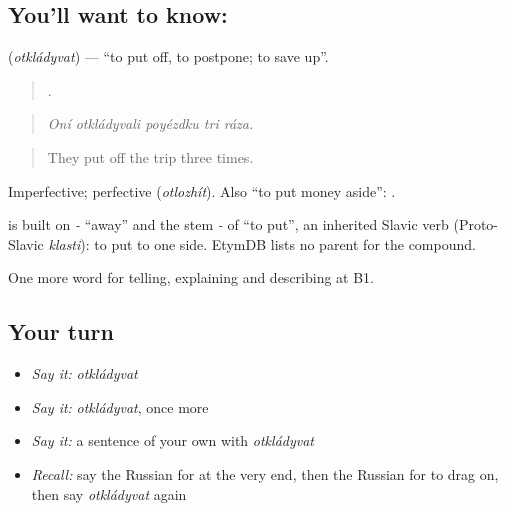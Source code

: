 \subsection*{You'll want to know: }
\textbf{} (\emph{otkládyvat}) — \textquotedblleft{}to put off, to postpone; to save up\textquotedblright{}.

\begin{quote}
    .
\end{quote}

\begin{quote}
\emph{Oní otkládyvali poyézdku tri ráza.}
\end{quote}

\begin{quote}
They put off the trip three times.
\end{quote}

Imperfective; perfective \emph{} (\emph{otlozhít}). Also \textquotedblleft{}to put money aside\textquotedblright{}: \emph{ }.

\begin{cousinweb}
\emph{} is built on \emph{-} \textquotedblleft{}away\textquotedblright{} and the stem \emph{-} of \emph{} \textquotedblleft{}to put\textquotedblright{}, an inherited Slavic verb (Proto-Slavic \emph{klasti}): to put to one side. EtymDB lists no parent for the compound.
\end{cousinweb}

\begin{grammarlens}[title={What you've built}]
One more word for telling, explaining and describing at B1.
\end{grammarlens}

\subsection*{Your turn}
\begin{itemize}
\raggedright
  \item \emph{Say it:} \emph{otkládyvat}
  \item \emph{Say it:} \emph{otkládyvat}, once more
  \item \emph{Say it:} a sentence of your own with \emph{otkládyvat}
  \item \emph{Recall:} say the Russian for at the very end, then the Russian for to drag on, then say \emph{otkládyvat} again
\end{itemize}

